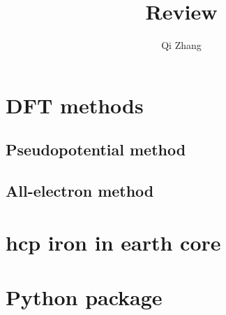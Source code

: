 \documentclass[12pt]{article}
\title{Review}		%
\author{Qi Zhang}								%
\date{}										%
\begin{document}

\tableofcontents
\listoffigures
\listoftables
\newpage

\section{DFT methods}
\subsection{Pseudopotential method}






\subsection{All-electron method}


\section{hcp iron in earth core}




\section{Python package}



\end{document}
